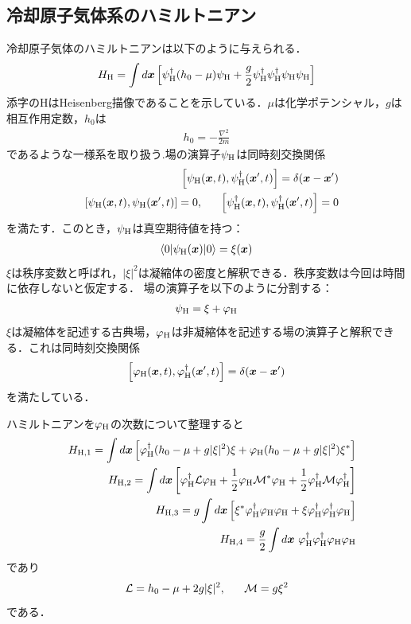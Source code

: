 \documentclass[10.5pt,a4paper]{jreport}
\begin{document}
\subsection{冷却原子気体系のハミルトニアン}
冷却原子気体のハミルトニアンは以下のように与えられる．
\begin{eqnarray}
  H_{\rm H}=\int d\bm{x}\left[\psi_{\rm H}^\dagger(h_0-\mu)\psi_{\rm H} +\frac{g}{2}\psi_{\rm H}^\dagger\psi_{\rm H}^\dagger\psi_{\rm H}\psi_{\rm H}\right]
\end{eqnarray}
添字のHはHeisenberg描像であることを示している．$\mu$は化学ポテンシャル，$g$は相互作用定数，$h_0$は
\begin{eqnarray}
  h_0 = -\frac{\nabla^2}{2m}
\end{eqnarray}
であるような一様系を取り扱う.場の演算子$\psi_{\rm H}$は同時刻交換関係
\begin{eqnarray}
  &&\left[\psi_{\rm H}(\bm{x},t),\psi_{\rm H}^\dagger(\bm{x}',t) \right] = \delta(\bm{x} - \bm{x}')\\
  &&\left[\psi_{\rm H}(\bm{x},t),\psi_{\rm H}(\bm{x}',t) \right] = 0,\ \ \ \ \ \left[\psi_{\rm H}^\dagger(\bm{x},t),\psi_{\rm H}^\dagger(\bm{x}',t) \right] = 0
\end{eqnarray}
を満たす．このとき，$\psi_{\rm H}$は真空期待値を持つ：
\begin{eqnarray}
  \langle 0|\psi_{\rm H}(\bm{x})|0\rangle = \xi(\bm{x})\label{vaccum_ex1}
\end{eqnarray}
$\xi$は秩序変数と呼ばれ，$|\xi|^2$は凝縮体の密度と解釈できる．秩序変数は今回は時間に依存しないと仮定する．
場の演算子を以下のように分割する：
\begin{eqnarray}
  \psi_{\rm H} = \xi + \varphi_{\rm H}
\end{eqnarray}
$\xi$は凝縮体を記述する古典場，$\varphi_{\rm H}$は非凝縮体を記述する場の演算子と解釈できる．これは同時刻交換関係
\begin{eqnarray}
  \left[\varphi_{\rm H}(\bm{x},t),\varphi^\dagger_{\rm H}(\bm{x}',t)\right]  = \delta(\bm{x}-\bm{x}')\label{equal_time_commutation}
\end{eqnarray}
を満たしている．

ハミルトニアンを$\varphi_{\rm H}$の次数について整理すると
\begin{eqnarray}
  &&H_{{\rm H},1} = \int d\bm{x}\left[\varphi^\dagger_{\rm H}(h_0 - \mu + g|\xi|^2)\xi + \varphi_{\rm H}(h_0 - \mu + g|\xi|^2)\xi^*\right]\\
  &&H_{{\rm H},2} = \int d\bm{x}\left[\varphi^\dagger_{\rm H} {\cal L}\varphi_{\rm H} + \frac{1}{2}\varphi_{\rm H}{\cal M^*}\varphi_{\rm H}+\frac{1}{2}\varphi^\dagger_{\rm H}{\cal M}\varphi^\dagger_{\rm H}\right]\\
  &&H_{{\rm H},3} = g\int d\bm{x}\left[\xi^*\varphi^\dagger_{\rm H}\varphi_{\rm H}\varphi_{\rm H} + \xi\varphi^\dagger_{\rm H}\varphi^\dagger_{\rm H}\varphi_{\rm H} \right] \\
  &&H_{{\rm H},4} = \frac{g}{2}\int d\bm{x}\ \varphi^\dagger_{\rm H}\varphi^\dagger_{\rm H}\varphi_{\rm H}\varphi_{\rm H}
\end{eqnarray}
であり
\begin{eqnarray}
  {\cal L} = h_0 - \mu +2g|\xi|^2,\ \ \ \ \ {\cal M}=g\xi^2
\end{eqnarray}
である．
\end{document}
